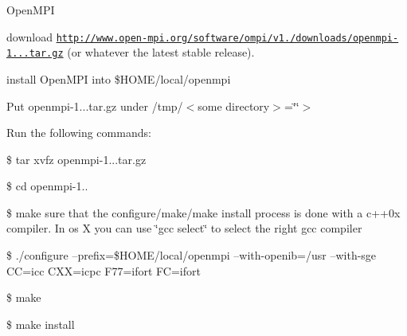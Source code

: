 
\begin{DoxyItemize}
\item Open\+M\+P\+I

download \href{http://www.open-mpi.org/software/ompi/v1.6/downloads/openmpi-1.6.3.tar.gz}{\tt http\+://www.\+open-\/mpi.\+org/software/ompi/v1./downloads/openmpi-\/1...\+tar.\+gz} (or whatever the latest stable release).

install Open\+M\+P\+I into \$\+H\+O\+M\+E/local/openmpi

Put openmpi-\/1...\+tar.\+gz under /tmp/$<$some directory$>$=\char`\"{}\char`\"{}$>$

Run the following commands\+:

\$ tar xvfz openmpi-\/1...\+tar.\+gz

\$ cd openmpi-\/1..
\end{DoxyItemize}

\$ make sure that the configure/make/make install process is done with a c++0x compiler. In os X you can use \char`\"{}gcc select\char`\"{} to select the right gcc compiler

\$ ./configure --prefix=\$\+H\+O\+M\+E/local/openmpi --with-\/openib=/usr --with-\/sge C\+C=icc C\+X\+X=icpc F77=ifort F\+C=ifort

\$ make

\$ make install 